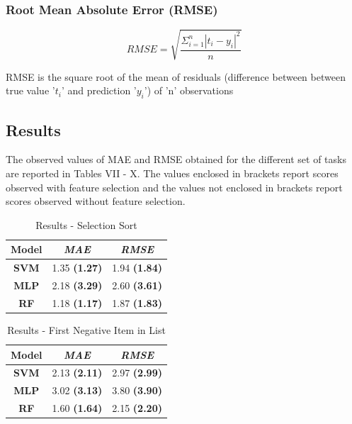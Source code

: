 \documentclass[conference]{IEEEtran}
\begin{document}
\subsubsection{\textbf{Root Mean Absolute Error (RMSE)}}

\[ RMSE = \sqrt{\frac{\Sigma_{i=1}^{n}{|t_i-y_i|}^2}{n}} \]

RMSE is the square root of the mean of residuals (difference between between true value '$t_{i}$' and prediction '$y_{i}$') of 'n' observations 

\subsection{Results}

The observed values of MAE and RMSE obtained for the different set of tasks are reported in Tables VII - X. The values enclosed in brackets report scores observed with feature selection and the values not enclosed in brackets report scores observed without feature selection. 


\begin{table}[h]
\centering
\begin{tabular}{|c|c|c|}
\hline
\textbf{Model} & \textit{\textbf{MAE}} & \textit{\textbf{RMSE}} \\ \hline
\textbf{SVM}   & 1.35 \textbf{(1.27)}           & 1.94 \textbf{(1.84)}            \\ \hline
\textbf{MLP}   & 2.18 \textbf{(3.29)}           & 2.60 \textbf{(3.61)}             \\ \hline
\textbf{RF}    & 1.18 \textbf{(1.17)}           & 1.87 \textbf{(1.83)}            \\ \hline
\end{tabular}
\caption{Results - Selection Sort}
\label{tab:selsort}
\end{table}


\begin{table}[h]
\centering
\begin{tabular}{|c|c|c|}
\hline
\textbf{Model} & \textit{\textbf{MAE}} & \textit{\textbf{RMSE}} \\ \hline
\textbf{SVM}   & 2.13 \textbf{(2.11)}           & 2.97 \textbf{(2.99)}            \\ \hline
\textbf{MLP}   & 3.02 \textbf{(3.13)}           & 3.80 \textbf{(3.90)}            \\ \hline
\textbf{RF}    & 1.60 \textbf{(1.64)}           & 2.15 \textbf{(2.20)}            \\ \hline
\end{tabular}
\caption{Results - First Negative Item in List}
\label{tab:first-neg}
\end{table}
\end{document}
